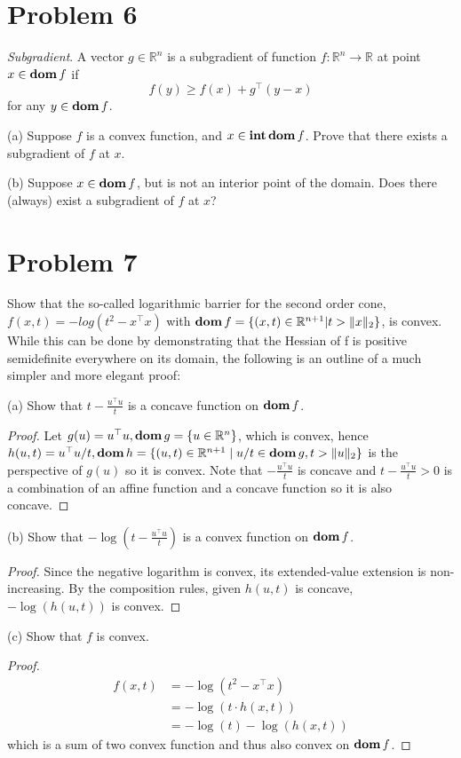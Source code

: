 \documentclass[11pt]{article}
\newcommand{\RR}{\mathbb{R}}
\newcommand{\T}{^\top}
\begin{document}
\clearpage
\section*{Problem 6}
\textit{Subgradient}. A vector $g\in \RR^n$ is a subgradient of function $f:\RR^n \rightarrow \RR$ at point $x\in\mathop{\textbf{dom}} f$ if
\[
f(y) \geq f(x) + g\T (y-x)
\] 
for any $y\in\mathop{\textbf{dom}} f$.

(a) Suppose $f$ is a convex function, and $x\in\mathop{\textbf{int}}\mathop{\textbf{dom}} f$. Prove that there exists a subgradient of $f$ at $x$.




(b) Suppose $x\in\mathop{\textbf{dom}} f$, but is not an interior point of the domain. Does there (always) exist a subgradient of $f$ at $x$?


\clearpage
\section*{Problem 7}
Show that the so-called logarithmic barrier for the second order cone, $f(x, t) = -log(t^2 - x\T x)$ with $\dom f = \{(x,t) \in \RR^{n+1} | t>\|x\|_2\}$, is convex.
While this can be done by demonstrating that the Hessian of f is positive semidefinite everywhere on its domain, the following is an outline of a much simpler and more elegant proof:

(a) Show that $t-\frac{u\T u}{t}$ is a concave function on $\mathop{\textbf{dom}} f$.
\begin{proof}
  Let $g(u) = u\T u, \dom g=\{u\in \RR^n\}$, which is convex, hence $h(u, t) = u\T u/t, \dom h = \{(u, t)\in \RR^{n+1} \mid u/t \in \dom g, t>\|u\|_2\}$ is the perspective of $g(u)$ so it is convex. Note that $- \frac{u\T u}{t}$ is concave and $t-\frac{u\T u}{t}>0$ is a combination of an affine function and a concave function so it is also concave.
\end{proof}

(b) Show that $-\log (t - \frac{u\T u}{t})$ is a convex function on $\mathop{\textbf{dom}} f$.
\begin{proof}
  Since the negative logarithm is convex, its extended-value extension is non-increasing. By the composition rules, given $h(u, t)$ is concave, $-\log(h(u,t))$ is convex.
\end{proof}

(c) Show that $f$ is convex.
\begin{proof}
  \begin{align*}
    f(x, t)
    &= -\log(t^2 - x\T x)\\
    &= -\log(t\cdot h(x, t))\\
    &= -\log(t) - \log(h(x, t))
  \end{align*}
  which is a sum of two convex function and thus also convex on $\mathop{\textbf{dom}} f$.
\end{proof}
\end{document}
